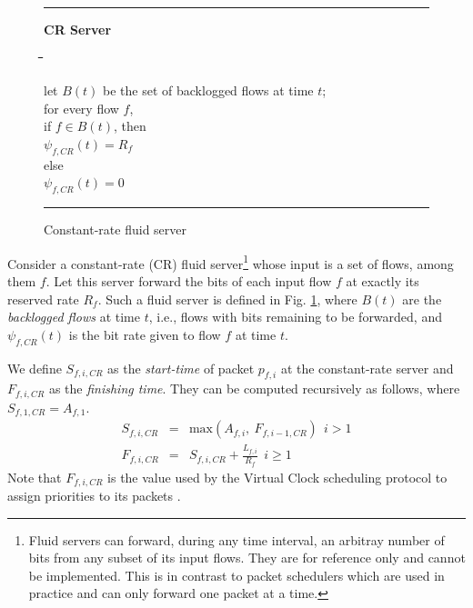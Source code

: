 \documentclass[conference]{IEEEtran}
\newlength{\tabsize}
\newcommand{\settabs}{
\tab{\tabsize}\=\tab{\tabsize}\=\tab{\tabsize}\=\tab{\tabsize}\=\tab{\tabsize}\=\tab{\tabsize}\=\tab{\tabsize}\=\tab{\tabsize}\=\tab{\tabsize}\=\tab{\tabsize}\=\tab{\tabsize}\=\tab{\tabsize}\=\tab{\tabsize}\=\kill
}
\newcommand{\tea}{\>}
\newcommand{\teb}{\>\>}
\newcommand{\tab}[1]{\makebox[#1]{}}
\begin{document}
\begin{figure}
\noindent
\rule{\columnwidth}{0.5mm}
\centerline{\bf CR Server}
\begin{tabbing}
\settabs
let $B(t)$ be the set of backlogged flows at time $t$;\\
for every flow $f$, \\
\tea if $f \in B(t)$, then\\
\teb     $\psi_{f,CR}(t) = R_f$\\
\tea else\\
\teb     $\psi_{f,CR}(t) = 0$
\end{tabbing}
\caption{Constant-rate fluid server}
\label{fig:CR}
\rule{\columnwidth}{0.5mm}
\end{figure}

Consider a constant-rate (CR) fluid server\footnote{Fluid servers can forward, 
during any time interval, an arbitray number of bits from any subset of its 
input flows.  They are for reference only and cannot be implemented. This is in 
contrast to  packet schedulers which are used in practice and can only forward 
one packet at a time.}  whose input is a set of flows, among them $f$.  Let 
this server forward the bits of each input flow $f$ at exactly its reserved 
rate $R_f$.  Such a fluid server is defined in Fig. \ref{fig:CR}, where $B(t)$ 
are the {\em backlogged flows} at time $t$, i.e., flows with bits remaining to 
be forwarded, and $\psi_{f,CR}(t)$ is the bit rate given to flow $f$ at time 
$t$.  

We define $S_{f,i,CR}$ as the {\em start-time} of packet $p_{f,i}$ at the 
constant-rate server and $F_{f,i,CR}$ as the {\em finishing time}.  They can be 
computed recursively as follows, where $S_{f,1,CR} = A_{f,1}$.
\begin{eqnarray}
\nonumber S_{f,i,CR} & = & \mbox{max}(A_{f,i},\ F_{f,i-1,CR})
                 \ \ \mbox{$i > 1$}\\
F_{f,i,CR} & = & S_{f,i,CR} + \frac{L_{f,i}}{R_{f}}
                 \ \ \mbox{$i \geq 1$} \label{eq:F-def}
\end{eqnarray}
Note that $F_{f,i,CR}$ is the value used by the Virtual Clock scheduling 
protocol to assign priorities to its packets \cite{VC-Lam, VC-Lixia}.
\end{document}
